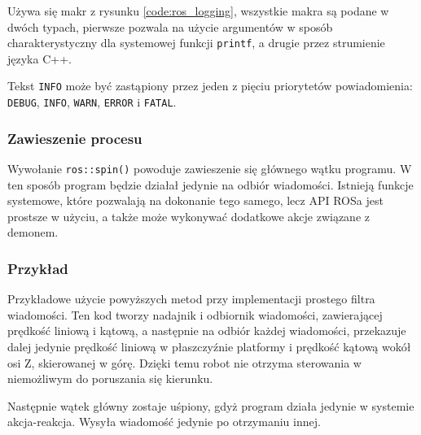 			Używa się makr z rysunku \ref{code:ros_logging}, wszystkie makra są podane w dwóch typach, pierwsze pozwala na użycie argumentów
			w sposób charakterystyczny dla systemowej funkcji \texttt{printf}, a drugie przez strumienie języka C++.
			
			Tekst \texttt{INFO} może być zastąpiony przez jeden z pięciu priorytetów powiadomienia: \texttt{DEBUG}, \texttt{INFO}, \texttt{WARN}, \texttt{ERROR} i \texttt{FATAL}.
			
		\subsubsection{Zawieszenie procesu}
			Wywołanie \texttt{ros::spin()} powoduje zawieszenie się głównego wątku programu. 
			W ten sposób program będzie działał jedynie na odbiór wiadomości.
			Istnieją funkcje systemowe, które pozwalają na dokonanie tego samego, lecz API ROSa jest prostsze w użyciu, a także może wykonywać dodatkowe akcje
			związane z demonem.
			
		\subsubsection{Przykład}
			Przykładowe użycie powyższych metod przy implementacji prostego filtra wiadomości. 
			Ten kod tworzy nadajnik i odbiornik wiadomości, zawierającej prędkość liniową i kątową, a następnie na odbiór każdej wiadomości,
			przekazuje dalej jedynie prędkość liniową w płaszczyźnie platformy i prędkość kątową wokół osi Z, skierowanej w górę.
			Dzięki temu robot nie otrzyma sterowania w niemożliwym do poruszania się kierunku.
			
			Następnie wątek główny zostaje uśpiony, gdyż program działa jedynie w systemie akcja-reakcja.
			Wysyła wiadomość jedynie po otrzymaniu innej.
			
